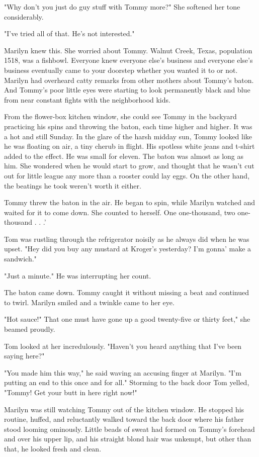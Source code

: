 \documentclass[10pt,a4paper]{article}
\begin{document}
"Why don't you just do guy stuff with Tommy more?" She softened her tone considerably.

"I've tried all of that. He's not interested."

Marilyn knew this. She worried about Tommy. Walnut Creek, Texas, population 1518, was a fishbowl. Everyone knew everyone else's business and everyone else's business eventually came to your doorstep whether you wanted it to or not. Marilyn had overheard catty remarks from other mothers about Tommy's baton. And Tommy's poor little eyes were starting to look permanently black and blue from near constant fights with the neighborhood kids.

From the flower-box kitchen window, she could see Tommy in the backyard practicing his spins and throwing the baton, each time higher and higher. It was a hot and still Sunday. In the glare of the harsh midday sun, Tommy looked like he was floating on air, a tiny cherub in flight. His spotless white jeans and t-shirt added to the effect. He was small for eleven. The baton was almost as long as him. She wondered when he would start to grow, and thought that he wasn't cut out for little league any more than a rooster could lay eggs. On the other hand, the beatings he took weren't worth it either.

Tommy threw the baton in the air. He began to spin, while Marilyn watched and waited for it to come down. She counted to herself. One one-thousand, two one-thousand . . .'

Tom was rustling through the refrigerator noisily as he always did when he was upset. "Hey did you buy any mustard at Kroger's yesterday? I'm gonna' make a sandwich."

"Just a minute." He was interrupting her count.

The baton came down. Tommy caught it without missing a beat and continued to twirl. Marilyn smiled and a twinkle came to her eye.

"Hot sauce!" That one must have gone up a good twenty-five or thirty feet," she beamed proudly.

Tom looked at her incredulously. "Haven't you heard anything that I've been saying here?"

"You made him this way," he said waving an accusing finger at Marilyn. "I'm putting an end to this once and for all." Storming to the back door Tom yelled, "Tommy! Get your butt in here right now!"

Marilyn was still watching Tommy out of the kitchen window. He stopped his routine, huffed, and reluctantly walked toward the back door where his father stood looming ominously. Little beads of sweat had formed on Tommy's forehead and over his upper lip, and his straight blond hair was unkempt, but other than that, he looked fresh and clean.
\end{document}
